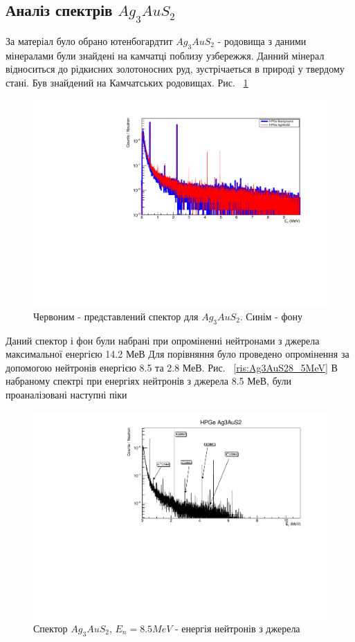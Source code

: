 \documentclass[a4paper, 14pt]{article}
\numberwithin{equation}{section}
\numberwithin{table}{section}
\begin{document}
	\subsection{Аналіз спектрів $Ag_3AuS_2$}
	За матеріал було обрано ютенбогардтит $Ag_3AuS_2$ - родовища з даними мінералами були знайдені на камчатці поблизу узбережжя. Данний мінерал відноситься до рідкисних золотоносних руд, зустрічаеться в природі у твердому стані. Був знайдений на Камчатських родовищах. Рис. ~\ref{ris:Ag3AuS2Fon}		
	\begin{figure}[hbt!]
		\centering \includegraphics[width=1\textwidth]{res/auFonAllLog.pdf}
		\caption{Червоним - представлений спектор для $Ag_3AuS_2$. Синім - фону} 
		\label{ris:Ag3AuS2Fon}	
	\end{figure} 	
	Даний спектор і фон були набрані при опроміненні нейтронами з джерела максимальної енергією 14.2 МеВ
	Для порівняння було проведено опромінення за допомогою нейтронів енергією 8.5 та 2.8 МеВ. Рис. ~\ref{ris:Ag3AuS28_5MeV}	
	В набраному спектрі при енергіях нейтронів з джерела 8.5 МеВ, були проаналізовані наступні піки
	\begin{figure}[hbt!]
		\centering \includegraphics[width=1\textwidth]{res/Au_AnzSpectr.pdf}
		\caption{Спектор $Ag_3AuS_2$, $E_{n} = 8.5 MeV$ - енергія нейтронів з джерела}
		\label{ris:Ag3AuS28_5MeVPick}	
	\end{figure} 
\end{document}
